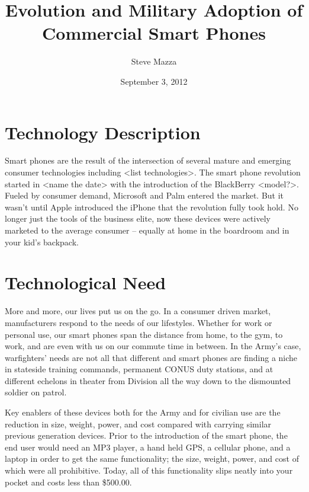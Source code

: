 \documentclass[letterpaper,10pt]{article}
\title{Evolution and Military Adoption of Commercial Smart Phones}
\author{Steve Mazza}
\date{September 3, 2012}
\begin{document}
\maketitle

\section*{Technology Description}
Smart phones are the result of the intersection of several mature and emerging consumer technologies including <list technologies>.  The smart phone revolution started in <name the date> with the introduction of the BlackBerry <model?>.  Fueled by consumer demand, Microsoft and Palm entered the market.  But it wasn't until Apple introduced the iPhone that the revolution fully took hold.  No longer just the tools of the business elite, now these devices were actively marketed to the average consumer -- equally at home in the boardroom and in your kid's backpack.

\section*{Technological Need}
More and more, our lives put us on the go.  In a consumer driven market, manufacturers respond to the needs of our lifestyles.  Whether for work or personal use, our smart phones span the distance from home, to the gym, to work, and are even with us on our commute time in between.  In the Army's case, warfighters' needs are not all that different and smart phones are finding a niche in stateside training commands, permanent CONUS duty stations, and at different echelons in theater from Division all the way down to the dismounted soldier on patrol.  

Key enablers of these devices both for the Army and for civilian use are the reduction in size, weight, power, and cost compared with carrying similar previous generation devices.  Prior to the introduction of the smart phone, the end user would need an MP3 player, a hand held GPS, a cellular phone, and a laptop in order to get the same functionality; the size, weight, power, and cost of which were all prohibitive.  Today, all of this functionality slips neatly into your pocket and costs less than \$500.00.
\end{document}
